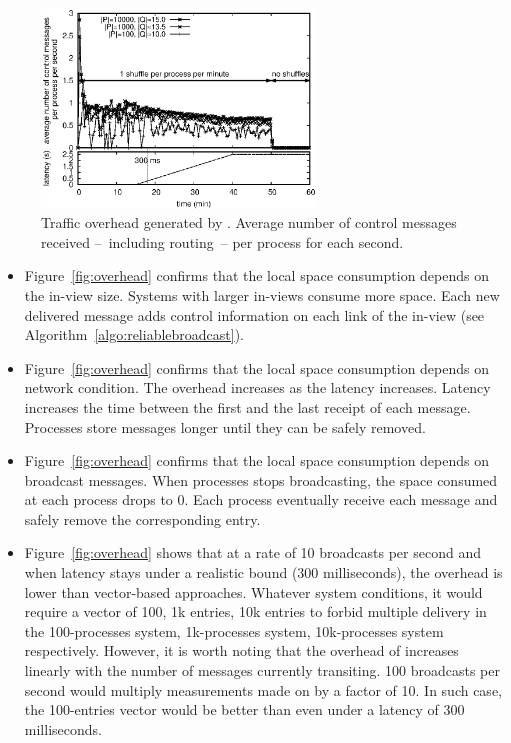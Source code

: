 \begin{figure}
  \begin{center}
    \includegraphics[width=0.65\textwidth]{./img/controlmessages.eps}
    \caption{\label{fig:controlmessages}Traffic overhead generated by
      \RPCBROADCAST.  Average number of control messages received --~including
      routing~-- per process for each second.}
  \end{center}
\end{figure}



\begin{itemize}[leftmargin=*]
\item Figure~\ref{fig:overhead} confirms that the local space consumption
  depends on the in-view size. Systems with larger in-views consume more
  space. Each new delivered message adds control information on each link of the
  in-view (see Algorithm~\ref{algo:reliablebroadcast}).
\item Figure~\ref{fig:overhead} confirms that the local space consumption
  depends on network condition. The overhead increases as the latency
  increases. Latency increases the time between the first and the last receipt
  of each message. Processes store messages longer until they can be safely
  removed. 
\item Figure~\ref{fig:overhead} confirms that the local space consumption
  depends on broadcast messages. When processes stops broadcasting, the space
  consumed at each process drops to 0. Each process eventually receive each
  message and safely remove the corresponding entry.
\item Figure~\ref{fig:overhead} shows that at a rate of 10 broadcasts per second
  and when latency stays under a realistic bound ($300$ milliseconds), the overhead is
  lower than vector-based approaches. Whatever system conditions, it would
  require a vector of 100, 1k entries, 10k entries to forbid multiple delivery
  in the 100-processes system, 1k-processes system, 10k-processes system
  respectively. However, it is worth noting that the overhead of \RPCBROADCAST
  increases linearly with the number of messages currently transiting. 100
  broadcasts per second would multiply measurements made on \RPCBROADCAST by a
  factor of 10. In such case, the 100-entries vector would be better than
  \RPCBROADCAST even under a latency of $300$ milliseconds. 
\end{itemize}

